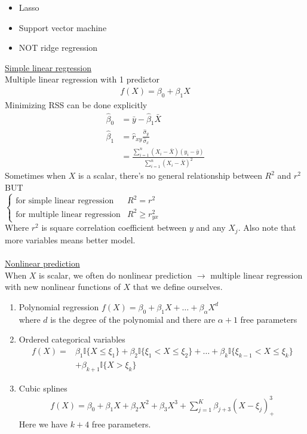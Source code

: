 \documentclass[12pt, letterpaper]{article}
\begin{document}
\begin{itemize}
    \item Lasso
    \item Support vector machine 
    \item NOT ridge regression
\end{itemize}
\underline{Simple linear regression} \\
Multiple linear regression with 1 predictor
\begin{align*}
    f(X) = \beta_0 + \beta_1 X
\end{align*} 
Minimizing RSS can be done explicitly
\begin{align*}
    \hat \beta_0 &= \bar y - \hat \beta_1 \bar X \\
    \hat \beta_1 &= \hat{r}_{xy} \frac{\hat \sigma_y}{\hat \sigma_x} \\
    &= \frac{\sum_{i=1}^{n}(X_i - \bar X)(y_i - \bar y)}{\sum_{i=1}^{n}(X_i - \bar X)^2}
\end{align*}
Sometimes when $X$ is a scalar, there's no general relationship between $R^2$ and $r^2$ BUT \\
$\begin{cases}
    \text{for simple linear regression} &R^2 = r^2 \\
    \text{for multiple linear regression} &R^2 \ge r^2_{yx}
\end{cases}$ \\
Where $r^2$ is square correlation coefficient between $y$ and any $X_j$. Also note that
more variables means better model. \\ \\
\underline{Nonlinear prediction} \\
When $X$ is scalar, we often do nonlinear prediction $\rightarrow$ multiple linear 
regression with new nonlinear functions of $X$ that we define ourselves.
\begin{enumerate}
    \item Polynomial regression $f(X) = \beta_0 + \beta_1X + \dots + \beta_\alpha X^d$ \\
    where $d$ is the degree of the polynomial and there are $\alpha + 1$ free parameters
    \item Ordered categorical variables
    \begin{align*}
        f(X) =& \beta_1 \mathbb{I}\{X \le \xi_1\} + \beta_2 \mathbb{I}\{\xi_1 < X \le \xi_2\} + \dots + \beta_k\mathbb{I}\{\xi_{k-1} < X \le \xi_k\}  \\
        &+ \beta_{k+1}\mathbb{I}\{X > \xi_k\}
    \end{align*}
    \item Cubic splines 
    \begin{align*}
        f(X) = \beta_0 + \beta_1X + \beta_2X^2 + \beta_3X^3 + \sum_{j=1}^{K}\beta_{j+3}(X-\xi_j)^3_+
    \end{align*}
    Here we have $k+4$ free parameters.
\end{enumerate}
\end{document}
